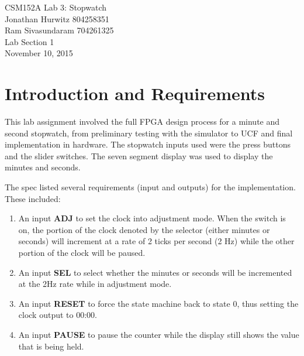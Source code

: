 \documentclass[journal]{IEEEtran}
\begin{document}
\newcommand{\labtitlepage}{
	\onecolumn
	\thispagestyle{empty} \vspace*{\fill}
	\begin{center}
		\LARGE\labtitle \\ \bigskip \bigskip \large\name \\ \bigskip
		\labsection \\ \bigskip \labdate 
	\end{center}
	\vspace*{\fill} \vspace*{\fill} \newpage
	\setcounter{page}{1}
	\twocolumn
}

\newcommand{\labtitle}{CSM152A Lab 3: Stopwatch}
\newcommand{\name}{Jonathan Hurwitz 804258351 \\ Ram Sivasundaram 704261325}
\newcommand{\labsection}{Lab Section 1}
\newcommand{\labdate}{November 10, 2015}


\labtitlepage

\section{Introduction and Requirements}

This lab assignment involved the full FPGA design process for a minute and second stopwatch, from preliminary testing with the simulator to UCF and final implementation in hardware. The stopwatch inputs used were the press buttons and the slider switches. The seven segment display was used to display the minutes and seconds.
\par
The spec listed several requirements (input and outputs) for the implementation. These included: 
\begin{enumerate}
	\item An input \textbf{ADJ} to set the clock into adjustment mode. When the switch is on, the portion of the clock denoted by the selector (either minutes or seconds) will increment at a rate of 2 ticks per second (2 Hz) while the other portion of the clock will be paused.
	\item An input \textbf{SEL} to select whether the minutes or seconds will be incremented at the 2Hz rate while in adjustment mode.
	\item An input \textbf{RESET} to force the state machine back to state 0, thus setting the clock output to 00:00.
	\item An input \textbf{PAUSE} to pause the counter while the display still shows the value that is being held.
\end{enumerate}
\end{document}
